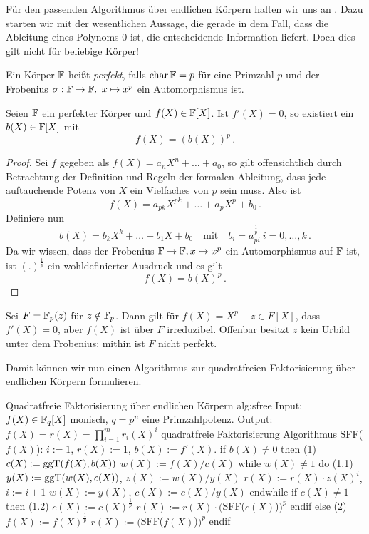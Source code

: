 Für den passenden Algorithmus über endlichen Körpern halten wir uns an
\autocite[Section 8.3]{geddes:algorithms}. Dazu starten wir mit der
wesentlichen Aussage, die gerade in dem Fall, dass die Ableitung eines Polynoms
$0$ ist, die entscheidende Information liefert. Doch dies gilt nicht für
beliebige Körper!

\begin{definition}
  Ein Körper $\mathbb{F}$ heißt \emph{perfekt}, falls $\operatorname{char} \mathbb{F} = p$ für eine
  Primzahl $p$ und der Frobenius $\sigma: \mathbb{F} \to \mathbb{F},\ x \mapsto x^p$ ein
  Automorphismus ist.
\end{definition}

\begin{prop}\label{prop:sfree1}
  Seien $\mathbb{F}$ ein perfekter Körper und $f(X) \in \mathbb{F}[X]$. 
  Ist $f'(X) = 0$, so existiert ein $b(X) \in \mathbb{F}[X]$ mit
  \[ f(X) = (b(X))^p\,.\]
\end{prop}

\begin{proof}
  Sei $f$ gegeben als $f(X) = a_nX^n + \ldots + a_0$, so gilt offensichtlich
  durch Betrachtung der Definition und Regeln der formalen Ableitung, dass
  jede auftauchende Potenz von $X$ ein Vielfaches von $p$ sein muss. Also ist
  \[ f(X) = a_{pk} X^{pk} + \ldots + a_p X^p + b_0\,.\]
  Definiere nun 
  \[ b(X) = b_k X^k + \ldots + b_1 X + b_0 \quad\text{mit}\quad
    b_i = a_{pi}^{\frac 1 p}\ i=0,\ldots,k\,.\]
  Da wir wissen, dass der Frobenius $\mathbb{F} \to \mathbb{F}, x \mapsto x^p$ ein
  Automorphismus auf $\mathbb{F}$ ist, ist $(.)^{\frac 1 p}$ ein wohldefinierter
  Ausdruck und es gilt 
  \[ f(X) = b(X)^p\,.\]
\end{proof}

\begin{beispiel}
  Sei $F = \mathbb{F}_p(z)$ für $z\notin \mathbb{F}_p$. Dann gilt für $f(X) = X^p-z \in F[X]$,
  dass $f'(X) = 0$, aber $f(X)$ ist über $F$ irreduzibel. Offenbar besitzt $z$
  kein Urbild unter dem Frobenius; mithin ist $F$ nicht perfekt.
\end{beispiel}


Damit können wir nun einen Algorithmus zur quadratfreien Faktorisierung über
endlichen Körpern formulieren.


\begin{pseudocode}{Quadratfreie Faktorisierung über endlichen Körpern}%
 {alg:sfree}
Input:  $f(X) \in \mathbb{F}_q[X]$ monisch, $q=p^n$ eine Primzahlpotenz.
Output: $f(X) = r(X) = \prod_{i=1}^m r_i(X)^i$ quadratfreie Faktorisierung
Algorithmus SFF($f(X)$):
$i:=1$, $r(X) := 1$, $b(X) := f'(X)$.
if $b(X) \neq 0$ then		(1)
  $c(X) := \operatorname{ggT}(f(X),b(X))$
  $w(X) := f(X) / c(X)$
  while $w(X) \neq 1$ do		(1.1)
    $y(X) := \operatorname{ggT}(w(X),c(X))$, $z(X) := w(X) / y(X)$
    $r(X) := r(X)\cdot z(X)^i$, $i := i+1$
    $w(X) := y(X)$, $c(X) := c(X) / y(X)$
  endwhile
  if $c(X) \neq 1$ then		(1.2)
    $c(X) := c(X)^{\frac 1 p}$
    $r(X) := r(X) \cdot ($SFF($c(X)$)$)^p$
  endif
else		(2)
  $f(X) := f(X)^{\frac 1 p}$
  $r(X) := ($SFF($f(X)$)$)^p$
endif
\end{pseudocode}


